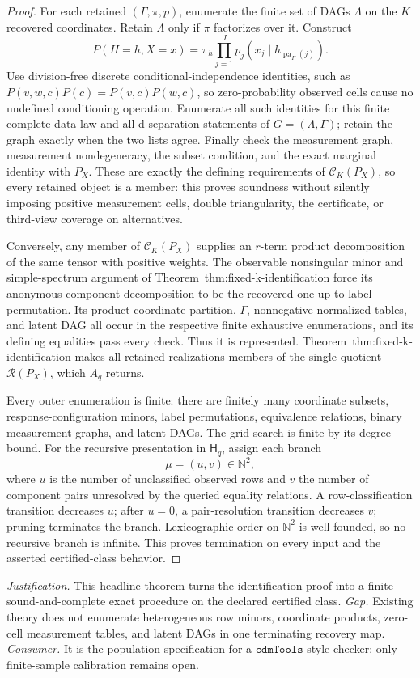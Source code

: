 \documentclass{article}
\begin{document}
\begin{proof}
For each retained \((\Gamma,\pi,p)\), enumerate the finite set of DAGs \(\Lambda\) on the \(K\) recovered coordinates.  Retain \(\Lambda\) only if \(\pi\) factorizes over it.  Construct
\[
 P(H=h,X=x)=\pi_h\prod_{j=1}^J
 p_j(x_j\mid h_{\operatorname{pa}_{\Gamma}(j)}).
\]
Use division-free discrete conditional-independence identities, such as \(P(v,w,c)P(c)=P(v,c)P(w,c)\), so zero-probability observed cells cause no undefined conditioning operation.  Enumerate all such identities for this finite complete-data law and all d-separation statements of \(G=(\Lambda,\Gamma)\); retain the graph exactly when the two lists agree.  Finally check the measurement graph, measurement nondegeneracy, the subset condition, and the exact marginal identity with \(P_X\).  These are exactly the defining requirements of \(\mathcal C_K(P_X)\), so every retained object is a member: this proves soundness without silently imposing positive measurement cells, double triangularity, the certificate, or third-view coverage on alternatives.

Conversely, any member of \(\mathcal C_K(P_X)\) supplies an \(r\)-term product decomposition of the same tensor with positive weights.  The observable nonsingular minor and simple-spectrum argument of Theorem~\textnormal{thm:fixed-k-identification} force its anonymous component decomposition to be the recovered one up to label permutation.  Its product-coordinate partition, \(\Gamma\), nonnegative normalized tables, and latent DAG all occur in the respective finite exhaustive enumerations, and its defining equalities pass every check.  Thus it is represented.  Theorem~\textnormal{thm:fixed-k-identification} makes all retained realizations members of the single quotient \(\mathcal R(P_X)\), which \(A_q\) returns.

Every outer enumeration is finite: there are finitely many coordinate subsets, response-configuration minors, label permutations, equivalence relations, binary measurement graphs, and latent DAGs.  The grid search is finite by its degree bound.  For the recursive presentation in \(\mathsf H_q\), assign each branch
\[
 \mu=(u,v)\in\mathbb N^2,
\]
where \(u\) is the number of unclassified observed rows and \(v\) the number of component pairs unresolved by the queried equality relations.  A row-classification transition decreases \(u\); after \(u=0\), a pair-resolution transition decreases \(v\); pruning terminates the branch.  Lexicographic order on \(\mathbb N^2\) is well founded, so no recursive branch is infinite.  This proves termination on every input and the asserted certified-class behavior.
\end{proof}
\par\smallskip\noindent \textit{Justification.} This headline theorem turns the identification proof into a finite sound-and-complete exact procedure on the declared certified class. \textit{Gap.} Existing theory does not enumerate heterogeneous row minors, coordinate products, zero-cell measurement tables, and latent DAGs in one terminating recovery map. \textit{Consumer.} It is the population specification for a \(\texttt{cdmTools}\)-style checker; only finite-sample calibration remains open.
\end{document}
